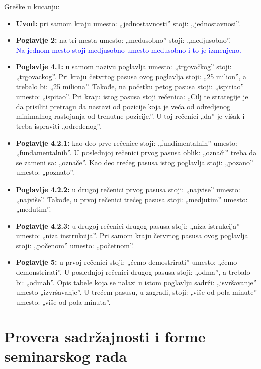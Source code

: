 \documentclass[a4paper]{report}
\newcommand{\odgovor}[1]{\textcolor{blue}{#1}}
\begin{document}
Greške u kucanju:
\begin{itemize}
 \item \textbf{Uvod:} pri samom kraju umesto: „jednostavnosti” stoji: „jednostavnosi”.
 
 \item \textbf{Poglavlje 2:} na tri mesta umesto: „međusobno” stoji: „medjusobno”.\\
 \odgovor{Na jednom mesto stoji medjusobno umesto međusobno i to je izmenjeno.\\}
 
 \item \textbf{Poglavlje 4.1:} u samom nazivu poglavlja umesto: „trgovačkog” stoji: „trgovackog”. Pri kraju četvrtog pasusa ovog poglavlja stoji: „25 milion”, a trebalo bi: „25 miliona”. Takođe, na početku petog pasusa stoji: „ispitiao” umesto: „ispitao”. Pri kraju istog pasusa stoji rečenica: „Cilj te strategije je da prisiliti pretragu da nastavi od pozicije koja je veća od odredjenog minimalnog rastojanja od trenutne pozicije.”. U toj rečenici „da” je višak i treba ispraviti „određenog”.
 
 \item \textbf{Poglavlje 4.2.1:} kao deo prve rečenice stoji: „fundimentalnih” umesto: „fundamentalnih”. U poslednjoj rečenici prvog pasusa oblik: „označi” treba da se zameni sa: „označe”. Kao deo trećeg pasusa istog poglavlja stoji: „pozano” umesto: „poznato”.
 
 \item \textbf{Poglavlje 4.2.2:} u drugoj rečenici prvog pasusa stoji: „najvise” umesto: „najviše”. Takođe, u prvoj rečenici trećeg pasusa stoji: „medjutim” umesto: „međutim”.
 
 \item \textbf{Poglavlje 4.2.3:} u drugoj rečenici drugog pasusa stoji: „niza istrukcija” umesto: „niza instrukcija”. Pri samom kraju četvrtog pasusa ovog poglavlja stoji: „počenom” umesto: „početnom”.
 
 \item \textbf{Poglavlje 5:} u prvoj rečenici stoji: „ćemo demostrirati” umesto: „ćemo demonstrirati”. U poslednjoj rečenici drugog pasusa stoji: „odma”, a trebalo bi: „odmah”. Opis tabele koja se nalazi u istom poglavlju sadrži: „isvršavanje” umesto „izvršavanje”. U trećem pasusu, u zagradi, stoji: „više od pola minute” umesto: „više od pola minuta”.
\end{itemize}


\section{Provera sadržajnosti i forme seminarskog rada}
\end{document}
